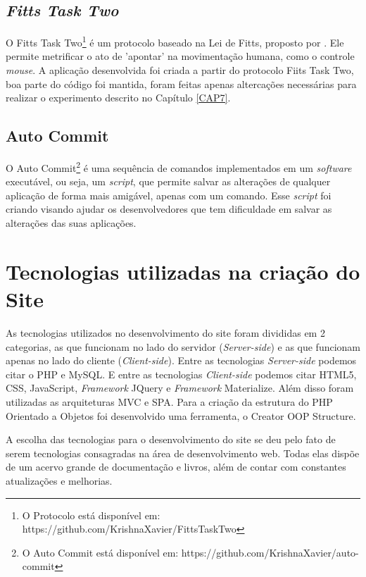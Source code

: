 \subsection{\textit{Fitts Task Two}}

O Fitts Task Two\footnote{O Protocolo está disponível em: https://github.com/KrishnaXavier/FittsTaskTwo} é um protocolo baseado na Lei de Fitts, proposto por . Ele permite metrificar o ato de 'apontar' na movimentação humana, como o controle \textit{mouse}. A aplicação desenvolvida foi criada a partir do protocolo Fiits Task Two, boa parte do código foi mantida, foram feitas apenas altercações necessárias para realizar o experimento descrito no Capítulo \ref{CAP7}.

\subsection{Auto Commit}

O Auto Commit\footnote{O Auto Commit está disponível em: https://github.com/KrishnaXavier/auto-commit} é uma sequência de comandos implementados em um \textit{software} executável, ou seja, um \textit{script}, que permite salvar as alterações de qualquer aplicação de forma mais amigável, apenas com um comando. Esse \textit{script} foi criando visando ajudar os desenvolvedores que tem dificuldade em salvar as alterações das suas aplicações.



\section{Tecnologias utilizadas na criação do Site}\label{Sub:tecnologias-site}
As tecnologias utilizados no desenvolvimento do site foram divididas em 2 categorias, as que funcionam no lado do servidor (\textit{Server-side}) e as que funcionam apenas no lado do cliente (\textit{Client-side}). Entre as tecnologias \textit{Server-side} podemos citar o PHP e MySQL. E entre as tecnologias \textit{Client-side} podemos citar HTML5, CSS, JavaScript, \textit{Framework }JQuery e \textit{Framework} Materialize. Além disso foram utilizadas as arquiteturas MVC e SPA. Para a criação da estrutura do PHP Orientado a Objetos foi desenvolvido uma ferramenta, o Creator OOP Structure.

A escolha das tecnologias para o desenvolvimento do site se deu pelo fato de serem tecnologias consagradas na área de desenvolvimento web. Todas elas dispõe de um acervo grande de documentação e livros, além de contar com constantes atualizações e melhorias.


